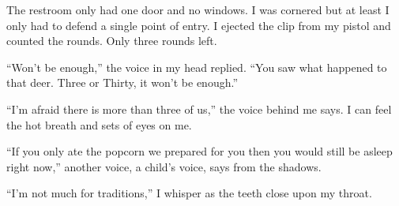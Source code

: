 The restroom only had one door and no windows. I was cornered but
at least I only had to defend a single point of entry. I ejected
the clip from my pistol and counted the rounds. Only three rounds
left.



``Won't be enough,'' the voice in my head replied. ``You saw what
happened to that deer. Three or Thirty, it won't be enough.''



``I'm afraid there is more than three of us,'' the voice behind me
says. I can feel the hot breath and sets of eyes on me.



``If you only ate the popcorn we prepared for you then you would
still be asleep right now,'' another voice, a child's voice, says
from the shadows.



``I'm not much for traditions,'' I whisper as the teeth close upon my
throat. 
 



